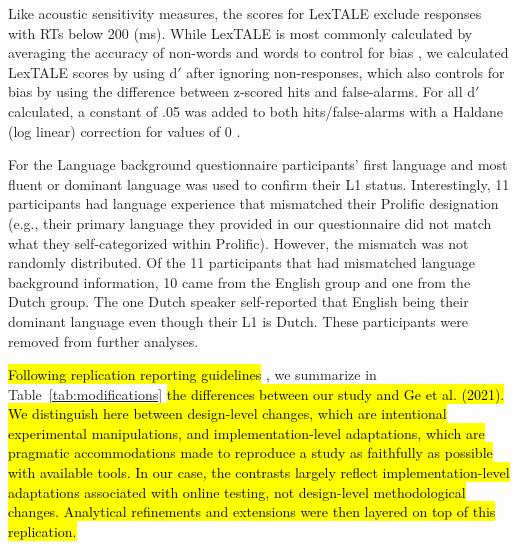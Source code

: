 Like acoustic sensitivity measures, the scores for LexTALE exclude responses with RTs below 200 (ms). While LexTALE is most commonly calculated by averaging the accuracy of non-words and words to control for bias \parencite{lemhofer2012introducing}, we calculated LexTALE scores by using d$'$ after ignoring non-responses, which also controls for bias by using the difference between z-scored hits and false-alarms. For all d$'$ calculated, a constant of .05 was added to both hits/false-alarms with a Haldane (log linear) correction for values of 0 \parencite{Hautus1995}. 

For the Language background questionnaire participants' first language and most fluent or dominant language was used to confirm their L1 status. Interestingly, 11 participants had language experience that mismatched their Prolific designation (e.g., their primary language they provided in our questionnaire did not match what they self-categorized within Prolific). However, the mismatch was not randomly distributed. Of the 11 participants that had mismatched language background information, 10 came from the English group and one from the Dutch group. The one Dutch speaker self-reported that English being their dominant language even though their L1 is Dutch. These participants were removed from further analyses.

\hl{Following replication reporting guidelines }\parencite{mcmanus2024}, we
summarize in Table~\ref{tab:modifications} \hl{the differences between our study and Ge et al. (2021). We distinguish here between design-level changes, which are intentional experimental manipulations, and implementation-level adaptations, which are pragmatic accommodations made to reproduce a study as faithfully as possible with available tools. In our case, the contrasts largely reflect implementation-level adaptations associated with online testing, not design-level methodological changes. Analytical refinements and extensions were then layered on top of this replication.}

\begin{table}[h]
    \centering
    \renewcommand{\arraystretch}{1.3}
    \caption{Key differences between Ge et al. (2021) and the present replication.}
    \label{tab:modifications}
\end{table}